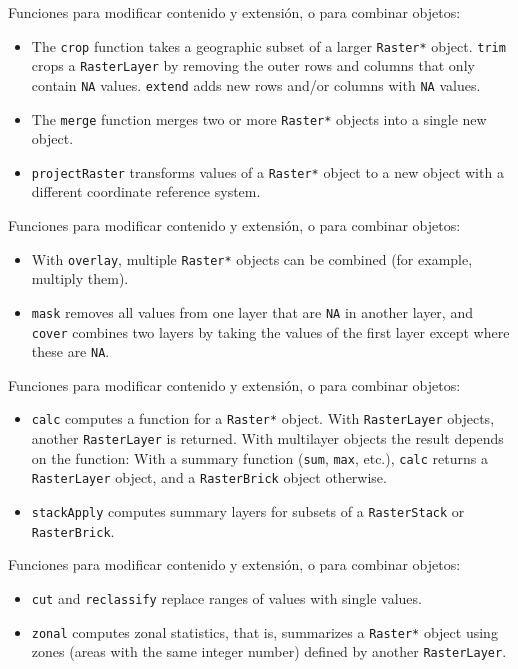 \documentclass[xcolor={usenames,svgnames,dvipsnames}]{beamer}
\begin{document}
\begin{frame}[fragile,label=sec-1-4]{Funciones para modificar contenido y extensión, o para combinar objetos:}
 \begin{itemize}
\item The \texttt{crop} function takes a geographic subset of a larger
\texttt{Raster*} object. \texttt{trim} crops a \texttt{RasterLayer}
by removing the outer rows and columns that only contain \texttt{NA}
values. \texttt{extend} adds new rows and/or columns with
\texttt{NA} values.
\item The \texttt{merge} function merges two or more \texttt{Raster*}
    objects into a single new object.
\item \texttt{projectRaster} transforms values of a \texttt{Raster*}
    object to a new object with a different coordinate reference system.
\end{itemize}
\end{frame}
\begin{frame}[fragile,label=sec-1-5]{Funciones para modificar contenido y extensión, o para combinar objetos:}
 \begin{itemize}
\item With \texttt{overlay}, multiple \texttt{Raster*} objects can be
combined (for example, multiply them).
\item \texttt{mask} removes all values from one layer that are
\texttt{NA} in another layer, and \texttt{cover} combines two layers
by taking the values of the first layer except where these are
\texttt{NA}.
\end{itemize}
\end{frame}
\begin{frame}[fragile,label=sec-1-6]{Funciones para modificar contenido y extensión, o para combinar objetos:}
 \begin{itemize}
\item \texttt{calc} computes a function for a \texttt{Raster*}
object. With \texttt{RasterLayer} objects, another
\texttt{RasterLayer} is returned. With multilayer objects the result
depends on the function: With a summary function (\texttt{sum},
\texttt{max}, etc.),  \texttt{calc} returns a \texttt{RasterLayer}
object, and a \texttt{RasterBrick} object otherwise.
\item \texttt{stackApply} computes summary layers for subsets of a
\texttt{RasterStack} or \texttt{RasterBrick}.
\end{itemize}
\end{frame}
\begin{frame}[fragile,label=sec-1-7]{Funciones para modificar contenido y extensión, o para combinar objetos:}
 \begin{itemize}
\item \texttt{cut} and \texttt{reclassify} replace ranges of values
with single values.
\item \texttt{zonal} computes zonal statistics, that is, summarizes a
\texttt{Raster*} object using zones (areas with the same integer
number) defined by another \texttt{RasterLayer}.
\end{itemize}
\end{frame}
\end{document}
